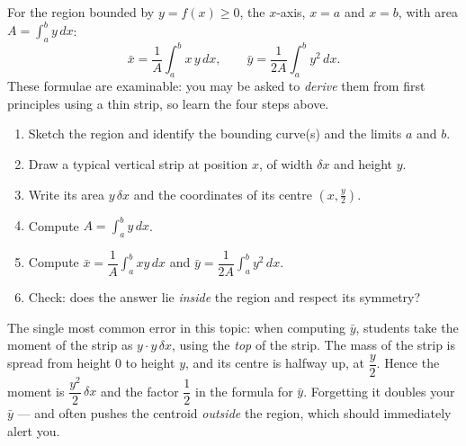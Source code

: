 \documentclass[11pt]{article}
\begin{document}
\begin{propriete}
For the region bounded by $y = f(x) \geq 0$, the $x$-axis, $x = a$ and $x = b$, with area $A = \displaystyle\int_a^b y\,dx$:
\[
\bar{x} = \frac{1}{A}\int_a^b x\,y\,dx, \qquad \bar{y} = \frac{1}{2A}\int_a^b y^2\,dx.
\]
These formulae are examinable: you may be asked to \emph{derive} them from first principles using a thin strip, so learn the four steps above.
\end{propriete}

\begin{methode}
\begin{enumerate}
\item Sketch the region and identify the bounding curve(s) and the limits $a$ and $b$.
\item Draw a typical vertical strip at position $x$, of width $\delta x$ and height $y$.
\item Write its area $y\,\delta x$ and the coordinates of its centre $\left(x, \tfrac{y}{2}\right)$.
\item Compute $A = \displaystyle\int_a^b y\,dx$.
\item Compute $\bar{x} = \dfrac{1}{A}\displaystyle\int_a^b xy\,dx$ and $\bar{y} = \dfrac{1}{2A}\displaystyle\int_a^b y^2\,dx$.
\item Check: does the answer lie \emph{inside} the region and respect its symmetry?
\end{enumerate}
\end{methode}

\begin{attention}
The single most common error in this topic: when computing $\bar{y}$, students take the moment of the strip as $y \cdot y\,\delta x$, using the \emph{top} of the strip. The mass of the strip is spread from height $0$ to height $y$, and its centre is halfway up, at $\dfrac{y}{2}$. Hence the moment is $\dfrac{y^2}{2}\,\delta x$ and the factor $\dfrac{1}{2}$ in the formula for $\bar{y}$. Forgetting it doubles your $\bar{y}$ — and often pushes the centroid \emph{outside} the region, which should immediately alert you.
\end{attention}
\end{document}
